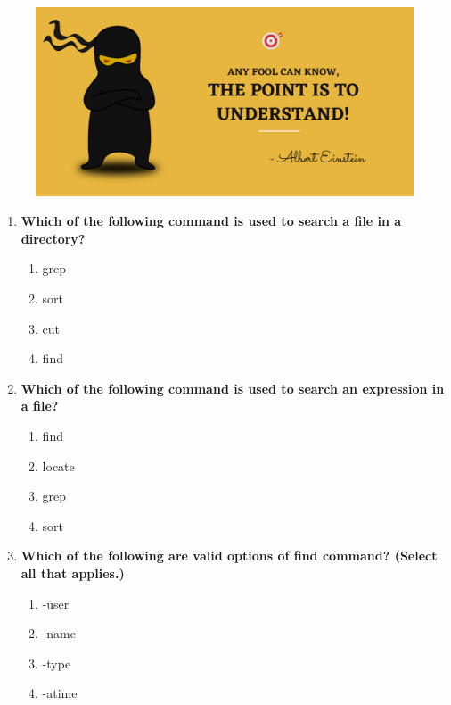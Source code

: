 \setlength{\columnsep}{3pt}
\begin{flushleft}
	
	\paragraph{}
	\bigskip
	
	\begin{figure}[h!]
		\centering
		\includegraphics[scale=.2]{content/practise.jpg}
	\end{figure}	
	\begin{enumerate}
		\item \textbf{Which of the following command is used to search a file in a directory?}
		\begin{enumerate}[label=(\alph*)]
			\item grep
			\item sort
			\item cut
			\item find    %
 		\end{enumerate}
		\bigskip
		\bigskip	
		
		\item \textbf{Which of the following command is used to search an expression in a file?}
		\begin{enumerate}[label=(\alph*)]
			\item find
			\item locate
			\item grep   %
			\item sort          
		\end{enumerate}
		\bigskip
		\bigskip
		
		
		\item \textbf{Which of the following are valid options of find command? (Select all that applies.)}
		\begin{enumerate}[label=(\alph*)]
			\item -user            %
			\item -name            %
			\item -type           %
			\item -atime          %
		\end{enumerate}
		\bigskip
		\bigskip
		

\end{enumerate}
\end{flushleft}
